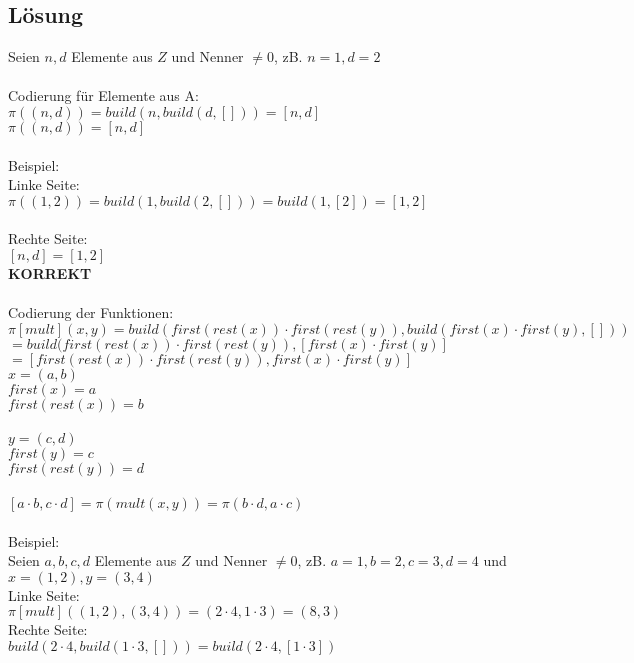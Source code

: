 \documentclass[12pt,runningheads,a4paper]{llncs}
\begin{document}
\subsection*{Lösung}
Seien $n,d$ Elemente aus $Z$ und Nenner $\neq 0$, zB. $n=1, d=2$  \\
\\
Codierung für Elemente aus A:\\
$\pi((n,d)) = build(n, build(d,[])) = [n,d]$ \\
$\pi((n,d)) = [n,d]$\\
\\
Beispiel:\\
Linke Seite:\\
$\pi((1,2)) = build(1, build(2, [])) = build(1,[2]) = [1,2]$\\
\\
Rechte Seite:\\
$[n,d] = [1,2]$\\
\textbf{KORREKT}\\
\\
Codierung der Funktionen:\\
$\pi[mult](x, y) = build(first(rest(x)) \cdot first(rest(y)), build(first(x) \cdot first(y), []))$\\
$= build(first(rest(x))\cdot first(rest(y)), [first(x)\cdot first(y)]$\\
$= [first(rest(x))\cdot first(rest(y)), first(x)\cdot first(y)]$\\
$x = (a,b)$\\
$first (x) = a$\\
$first(rest(x)) = b$\\
\\
$y = (c,d)$\\
$first(y) = c$\\
$first(rest(y)) = d$\\
\\
$[a\cdot b, c\cdot d] = \pi(mult(x,y))= \pi (b\cdot d, a\cdot c)$\\
\\
Beispiel:\\
Seien $a, b, c, d$ Elemente aus $Z$ und Nenner $\neq 0$, zB. $a=1, b=2, c= 3, d=4$ und $x = (1,2), y = (3,4)$ \\
Linke Seite:\\
$\pi[mult]((1,2), (3,4)) = (2 \cdot 4, 1 \cdot 3) = (8, 3)$\\
Rechte Seite:\\
$build(2\cdot 4, build(1\cdot 3, []))= build(2\cdot 4, [1 \cdot 3])$\\
\end{document}
